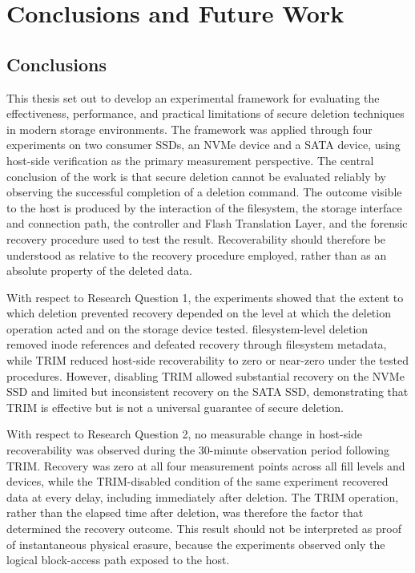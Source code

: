 \chapter{Conclusions and Future Work}
\label{sec:conclusions-future-work}

\section{Conclusions}
This thesis set out to develop an experimental framework for evaluating the effectiveness, performance, and practical limitations of secure deletion techniques in modern 
storage environments. The framework was applied through four experiments on two consumer SSDs, an NVMe device and a SATA device, using host-side verification as the 
primary measurement perspective. The central conclusion of the work is that secure deletion cannot be evaluated reliably by observing the successful completion of a 
deletion command. The outcome visible to the host is produced by the interaction of the filesystem, the storage interface and connection path, the controller and Flash 
Translation Layer, and the forensic recovery procedure used to test the result. Recoverability should therefore be understood as relative to the recovery procedure 
employed, rather than as an absolute property of the deleted data.

With respect to Research Question 1, the experiments showed that the extent to which deletion prevented recovery depended on the level at which the deletion operation 
acted and on the storage device tested. filesystem-level deletion removed inode references and defeated recovery through filesystem metadata, while TRIM reduced 
host-side recoverability to zero or near-zero under the tested procedures. However, disabling TRIM allowed substantial recovery on the NVMe SSD and limited but 
inconsistent recovery on the SATA SSD, demonstrating that TRIM is effective but is not a universal guarantee of secure deletion.

With respect to Research Question 2, no measurable change in host-side recoverability was observed during the 30-minute observation period following TRIM. Recovery was 
zero at all four measurement points across all fill levels and devices, while the TRIM-disabled condition of the same experiment recovered data at every delay, including 
immediately after deletion. The TRIM operation, rather than the elapsed time after deletion, was therefore the factor that determined the recovery outcome. This result 
should not be interpreted as proof of instantaneous physical erasure, because the experiments observed only the logical block-access path exposed to the host.

